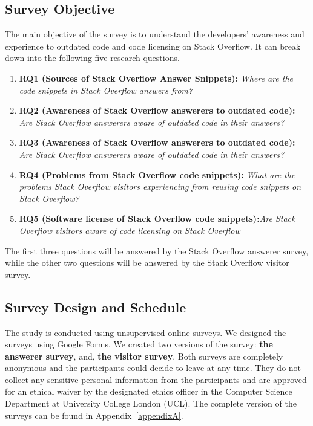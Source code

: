 \documentclass{svjour3}                     %
\begin{document}
\subsection{Survey Objective}
The main objective of the survey is to understand the developers' awareness and
experience to outdated code and code licensing on Stack Overflow. It can break
down into the following five research questions.

\begin{enumerate}
	\item \textbf{RQ1 (Sources of Stack Overflow Answer Snippets):} \textit{Where are the code snippets in Stack Overflow answers from?}
	\item \textbf{RQ2 (Awareness of Stack Overflow answerers to outdated code):} \textit{Are Stack Overflow answerers aware of outdated code in their answers?}
	\item \textbf{RQ3 (Awareness of Stack Overflow answerers to outdated code):} \textit{Are Stack Overflow answerers aware of outdated code in their answers?}
	\item \textbf{RQ4 (Problems from Stack Overflow code snippets):} \textit{What are the problems Stack Overflow visitors experiencing from reusing code snippets on Stack Overflow?}
	\item \textbf{RQ5 (Software license of Stack Overflow code snippets):}\textit{Are Stack Overflow visitors aware of code licensing on Stack Overflow}
\end{enumerate}

The first three questions will be answered by
the Stack Overflow answerer survey, while the other two questions will be
answered by the Stack Overflow visitor survey.

\subsection{Survey Design and Schedule}
The study is conducted using unsupervised online surveys. We designed the surveys using
Google Forms. We created two versions of the
survey: \textbf{the answerer survey}, and, \textbf{the visitor survey}. Both
surveys are completely anonymous and the participants could decide to leave at
any time. They do not collect any sensitive personal information from the
participants and are approved for an ethical waiver by the designated ethics
officer in the Computer Science Department at University College London (UCL). 
The complete version of the surveys can be found in 
Appendix~\ref{appendixA}.
\end{document}
